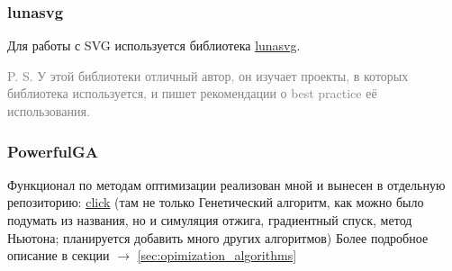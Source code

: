 \subsubsection{lunasvg}
Для работы с SVG используется библиотека \href{https://github.com/sammycage/lunasvg}{lunasvg}.

\textcolor{gray}{P. S. У этой библиотеки отличный автор, он изучает проекты, в которых библиотека используется, и пишет рекомендации о best practice её использования.}

\subsubsection{PowerfulGA}
Функционал по методам оптимизации реализован мной и вынесен в отдельную репозиторию: \href{https://github.com/donRumata03/PowerfulGA}{click}
(там не только Генетический алгоритм, как можно было подумать из названия, но и симуляция отжига, градиентный спуск, метод Ньютона;
планируется добавить много других алгоритмов)
Более подробное описание в секции $\longrightarrow$ \ref{sec:opimization_algorithms}